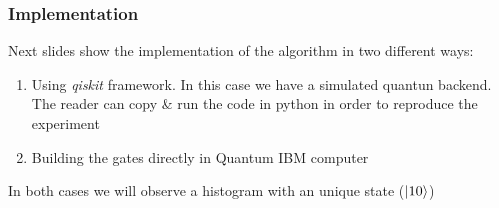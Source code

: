 \begin{frame}
	\frametitle{Implementation}

	Next slides show the implementation of the algorithm in two different ways:
	\begin{enumerate}
		\item Using \textit{qiskit} framework. In this case we have a simulated quantun backend. The reader can copy \& run the code in python in order to reproduce the experiment
		\item Building the gates directly in Quantum IBM computer
	\end{enumerate}
\begin{block}{}
	\begin{center}
		In both cases we will observe a histogram with an unique state ($\ket{10}$)
	\end{center}
\end{block}
\end{frame}
%
%				
%
%
%
%
%
%
%
